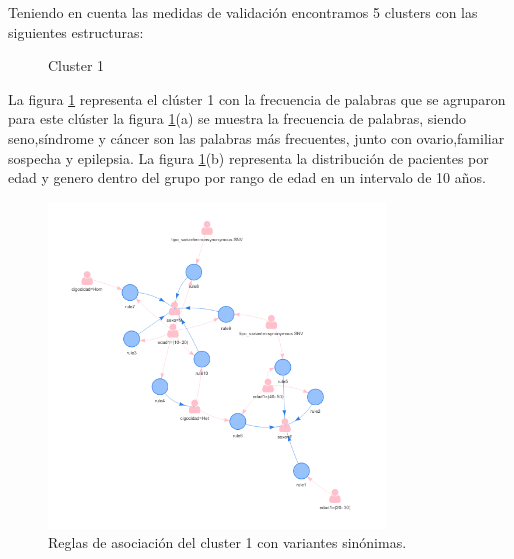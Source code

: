 Teniendo en cuenta las medidas de validación encontramos  5 clusters con las siguientes estructuras:

\begin{figure}[H]
	\centering
	\label{f:nube1}
	\caption{Cluster 1} \label{fig:cluster1}
\end{figure} 

La figura \ref{fig:cluster1} representa el clúster 1 con la frecuencia de palabras que se agruparon para este clúster  la figura \ref{fig:cluster1}(a) se muestra la frecuencia de palabras, siendo seno,síndrome y cáncer son las palabras más frecuentes, junto con ovario,familiar sospecha y epilepsia. La figura \ref{fig:cluster1}(b) representa la distribución de pacientes por edad y genero dentro del grupo por rango de edad en un intervalo de 10 años.\\

\begin{figure}[H]
	\centering
	\includegraphics[width=0.8\textwidth]{Kap4/reglas1_1}
	\caption{Reglas de asociación del cluster 1 con variantes sinónimas.} \label{fig:reglas1}
\end{figure}

